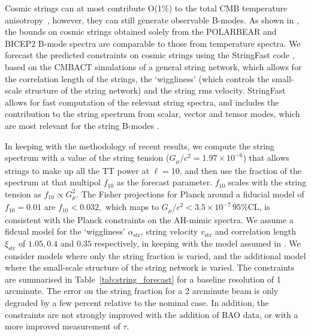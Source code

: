 Cosmic strings can at most contribute O(1\%) to the total CMB temperature anisotropy~\cite{Ade:2013xla,Lizarraga:2014xza,Lazanu:2014eya}, however, they can still generate observable B-modes. As shown in \cite{Moss:2014cra}, the bounds on cosmic strings obtained solely from the POLARBEAR \cite{Ade:2014afa} and BICEP2  \cite{Ade:2014xna} B-mode spectra are comparable to those from temperature spectra. 
We forecast the predicted constraints on cosmic strings using the StringFast code \cite{Foreman:2011uj}, based on the CMBACT simulations \cite{Pogosian:1999np} of a general string network, which allows for the correlation length of the strings, the `wiggliness' (which controls the small-scale structure of the string network) and the string rms velocity. StringFast allows for fast computation of the relevant string spectra, and includes the contribution to the string spectrum from scalar, vector and tensor modes, which are most relevant for the string B-modes \cite{Foreman:2011uj}.

In keeping with the methodology of recent results, we compute the string spectrum with a value of the string tension ($G_\mu/c^2=1.97\times10^{-6}$) that allows strings to make up all the TT power at $\ell=10$, and then use the fraction of the spectrum at that multipol $f_{10}$ as the forecast parameter. $f_10$ scales with the string tension as $f_{10} \propto G_\mu^2.$ The Fisher projections for Planck around a fiducial model of $f_{10}=0.01$ are $f_{10}<0.032,$ which maps to $G_\mu/c^2 < 3.5\times 10^{-7}\, 95\% \mathrm{CL}$, is consistent with the Planck constraints on the AH-mimic spectra.
We assume a fidcual model for the `wiggliness' $\alpha_\mathrm{str}$, string velocity $v_\mathrm{str}$ and correlation length $\xi_\mathrm{str}$ of $1.05, 0.4$ and $0.35$ respectively, in keeping with the model assumed in \cite{Foreman:2011uj}. We consider models where only the string fraction is varied, and the additional model where the small-scale structure of the string network is varied. The constraints are summarised in Table~\ref{tab:string_forecast} for a baseline resolution of 1 arcminute. The error on the string fraction for a 2 arcminute beam is only degraded by a few percent relative to the nominal case. In addition, the constraints are not strongly improved with the addition of BAO data, or with a more improved measurement of $\tau$.



